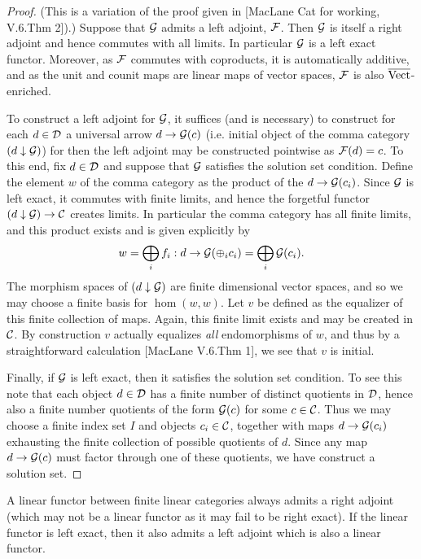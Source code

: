 \documentclass{amsart}
\begin{document}
\begin{proof}
	(This is a variation of the proof given in [MacLane Cat for working, V.6.Thm 2]).)
\cite{???}
Suppose that $\mathcal G$ admits a left adjoint, $\mathcal F$. Then $\mathcal G$ is itself a right adjoint and hence commutes with all limits. In particular $\mathcal G$ is a left exact functor. Moreover, as $\mathcal F$ commutes with coproducts, it is automatically additive, and as the unit and counit maps are linear maps of vector spaces, $\mathcal F$ is also $\overline{\mathrm{Vect}}$-enriched. 


To construct a left adjoint for $\mathcal G$, it suffices (and is necessary) to construct for each $d \in \mathcal D$ a universal arrow $d \to \mathcal G(c)$ (i.e. initial object of the comma category $(d \downarrow \mathcal G)$)
 for then the left adjoint may be constructed pointwise as $\mathcal F(d) = c$. To this end, fix $d \in \mathcal D$ and suppose that $\mathcal G$ satisfies the solution set condition. Define the element $w$ of the comma category as the product of the $d \to \mathcal G(c_i)$. Since $\mathcal G$ is left exact, it commutes with finite limits, and hence the forgetful functor $(d \downarrow \mathcal G) \to \mathcal C$ creates limits. In particular the comma category has all finite limits, and this  product exists and is given explicitly by 
\begin{equation*}
	w = \bigoplus_i f_i :  d \to \mathcal G( \oplus_i c_i) = \bigoplus_i \mathcal G(c_i).
\end{equation*}
The morphism spaces of $(d \downarrow \mathcal G)$ are finite dimensional vector spaces, and so we may choose a finite basis for $\hom(w,w)$. Let $v$ be defined as the equalizer of this finite collection of maps. Again, this finite limit exists and may be created in $\mathcal C$. By construction $v$ actually equalizes {\em all} endomorphisms of $w$, and thus by a straightforward calculation [MacLane V.6.Thm 1], we see that $v$ is initial. 

Finally, if $\mathcal G$ is left exact, then it satisfies the solution set condition. To see this note that each object $d \in \mathcal D$  has a finite number of distinct quotients in $\mathcal D$, hence also a finite number quotients of the form  $\mathcal G(c)$ for some $c \in \mathcal C$. Thus we may choose a finite index set $I$ and objects  $c_i \in \mathcal C$, together with maps $d \to \mathcal G(c_i)$ exhausting the finite collection of possible quotients of $d$. Since any map $d \to \mathcal G(c)$ must factor through one of these quotients, we have construct a solution set.   
\end{proof}

\begin{corollary}
	A linear functor between finite linear categories always admits a right adjoint (which may not be a linear functor as it may fail to be right exact). If the linear functor is left exact, then it also admits a left adjoint which is also a linear functor. 
\end{corollary}
\end{document}
